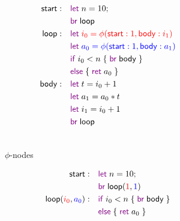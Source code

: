 \documentclass[acmsmall,screen,review]{acmart}
\newcommand{\ms}[1]{\ensuremath{\mathsf{#1}}}
\newcommand{\kwms}[1]{\textcolor{violet}{\ms{#1}}}
\newcommand{\lbms}[1]{{\ms{#1}}}
\begin{document}
\begin{figure}
  \begin{subfigure}[t]{.35\textwidth}
    \centering
    \begin{adjustbox}{minipage=1.2\textwidth,scale=0.8}
    \begin{align*}
      \lbms{start}:\quad  & \kwms{let}\;n = 10; \\
                          & \kwms{br}\;\ms{loop} \\
      \lbms{loop}: \quad  & \begingroup \color{red}
                            \kwms{let}\;i_0 = \phi(\ms{start}: 1, \ms{body}: i_1) 
                          \endgroup \\
                          & \begingroup \color{blue}
                            \kwms{let}\;a_0 = \phi(\ms{start}: 1, \ms{body}: a_1) 
                          \endgroup \\
                          & \kwms{if}\;i_0 < n\;\{\;\kwms{br}\;\lbms{body}\;\} \\
                          & \kwms{else}\;\{\;\kwms{ret}\;a_0\;\} \\
      \lbms{body}: \quad  & \kwms{let}\;t = i_0 + 1 \\
                          & \kwms{let}\;a_1 = a_0 * t \\
                          & \kwms{let}\;i_1 = i_0 + 1 \\
                          & \kwms{br}\;\lbms{loop} \\ \\
    \end{align*}
    \end{adjustbox}
    \caption{$\phi$-nodes}
    \label{fig:fact-phi}
  \end{subfigure}%
  \begin{subfigure}[t]{.35\textwidth}
    \centering
    \begin{adjustbox}{minipage=1.2\textwidth,scale=0.8}
    \begin{align*}
      \lbms{start}:\quad            & \kwms{let}\;n = 10; \\
                                    & \kwms{br}\;
                                        \lbms{loop}(\textcolor{red}{1}, \textcolor{blue}{1}) \\
      \lbms{loop}(\textcolor{red}{i_0}, \textcolor{blue}{a_0}): \quad  
                                    & \kwms{if}\;i_0 < n\; \{\;\kwms{br}\;\lbms{body}\;\} \\
                                    & \kwms{else}\;\{\;\kwms{ret}\;a_0\;\} \\

\end{align*}
\end{adjustbox}
\end{subfigure}
\end{figure}
\end{document}
